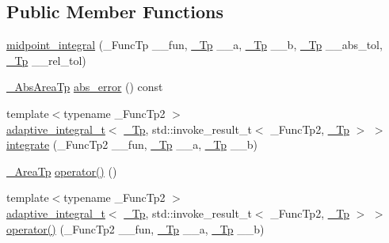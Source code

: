 \subsection*{Public Member Functions}
\begin{DoxyCompactItemize}
\item 
\hyperlink{class____gnu__cxx_1_1midpoint__integral_ab62eec15eb135eb9027724a5367c89b9}{midpoint\+\_\+integral} (\+\_\+\+Func\+Tp \+\_\+\+\_\+fun, \hyperlink{namespace____gnu__cxx_a3b19a9c800ca194374ef9172290f7d79}{\+\_\+\+Tp} \+\_\+\+\_\+a, \hyperlink{namespace____gnu__cxx_a3b19a9c800ca194374ef9172290f7d79}{\+\_\+\+Tp} \+\_\+\+\_\+b, \hyperlink{namespace____gnu__cxx_a3b19a9c800ca194374ef9172290f7d79}{\+\_\+\+Tp} \+\_\+\+\_\+abs\+\_\+tol, \hyperlink{namespace____gnu__cxx_a3b19a9c800ca194374ef9172290f7d79}{\+\_\+\+Tp} \+\_\+\+\_\+rel\+\_\+tol)
\item 
\hyperlink{class____gnu__cxx_1_1midpoint__integral_ae4c2b0cff4d7385e5c046ec4400bc69e}{\+\_\+\+Abs\+Area\+Tp} \hyperlink{class____gnu__cxx_1_1midpoint__integral_a2a94b9b48126ac73821c1e38223bfc33}{abs\+\_\+error} () const
\item 
{\footnotesize template$<$typename \+\_\+\+Func\+Tp2 $>$ }\\\hyperlink{struct____gnu__cxx_1_1adaptive__integral__t}{adaptive\+\_\+integral\+\_\+t}$<$ \hyperlink{namespace____gnu__cxx_a3b19a9c800ca194374ef9172290f7d79}{\+\_\+\+Tp}, std\+::invoke\+\_\+result\+\_\+t$<$ \+\_\+\+Func\+Tp2, \hyperlink{namespace____gnu__cxx_a3b19a9c800ca194374ef9172290f7d79}{\+\_\+\+Tp} $>$ $>$ \hyperlink{class____gnu__cxx_1_1midpoint__integral_ae991ad240c41205cbe4e68ef59bc6ca8}{integrate} (\+\_\+\+Func\+Tp2 \+\_\+\+\_\+fun, \hyperlink{namespace____gnu__cxx_a3b19a9c800ca194374ef9172290f7d79}{\+\_\+\+Tp} \+\_\+\+\_\+a, \hyperlink{namespace____gnu__cxx_a3b19a9c800ca194374ef9172290f7d79}{\+\_\+\+Tp} \+\_\+\+\_\+b)
\item 
\hyperlink{class____gnu__cxx_1_1midpoint__integral_a43cd31237c2257dd657a2a84fd33dd69}{\+\_\+\+Area\+Tp} \hyperlink{class____gnu__cxx_1_1midpoint__integral_aed17a2e7f3970c07e8ed08262dfe5430}{operator()} ()
\item 
{\footnotesize template$<$typename \+\_\+\+Func\+Tp2 $>$ }\\\hyperlink{struct____gnu__cxx_1_1adaptive__integral__t}{adaptive\+\_\+integral\+\_\+t}$<$ \hyperlink{namespace____gnu__cxx_a3b19a9c800ca194374ef9172290f7d79}{\+\_\+\+Tp}, std\+::invoke\+\_\+result\+\_\+t$<$ \+\_\+\+Func\+Tp2, \hyperlink{namespace____gnu__cxx_a3b19a9c800ca194374ef9172290f7d79}{\+\_\+\+Tp} $>$ $>$ \hyperlink{class____gnu__cxx_1_1midpoint__integral_aecb7f4b62849fe4d6b8a0f5cb2c6319f}{operator()} (\+\_\+\+Func\+Tp2 \+\_\+\+\_\+fun, \hyperlink{namespace____gnu__cxx_a3b19a9c800ca194374ef9172290f7d79}{\+\_\+\+Tp} \+\_\+\+\_\+a, \hyperlink{namespace____gnu__cxx_a3b19a9c800ca194374ef9172290f7d79}{\+\_\+\+Tp} \+\_\+\+\_\+b)
\end{DoxyCompactItemize}


